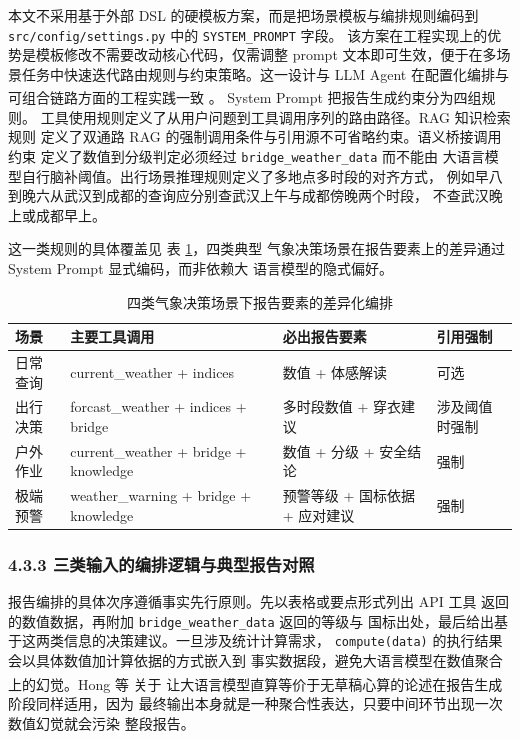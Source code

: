 \documentclass[a4paper]{article}
\newcommand{\song}{\CJKfamily{song}}
\theoremstyle{definition}
\theoremstyle{plain}
\theoremstyle{remark}
\newcommand{\reftab}[1]{表 \ref{#1}}
\let\oldcite\cite
\renewcommand{\cite}[1]{\textsuperscript{\oldcite{#1}}}
\newcommand{\bk}{\discretionary{}{}{}}
\begin{document}
本文不采用基于外部 DSL 的硬模板方案，而是把场景模板与编排规则编码到
\texttt{src/\bk{}config/\bk{}settings.\bk{}py} 中的 \texttt{SYSTEM\_\bk{}PROMPT} 字段。
该方案在工程实现上的优势是模板修改不需要改动核心代码，仅需调整 prompt
文本即可生效，便于在多场景任务中快速迭代路由规则与约束策略。这一设计与
LLM Agent 在配置化编排与可组合链路方面的工程实践一致 \cite{ref10,ref15,ref18}。
System Prompt 把报告生成约束分为四组规则。
工具使用规则定义了从用户问题到工具调用序列的路由路径。RAG 知识检索规则
定义了双通路 RAG 的强制调用条件与引用源不可省略约束。语义桥接调用约束
定义了数值到分级判定必须经过 \texttt{bridge\_\bk{}weather\_\bk{}data} 而不能由
大语言模型自行脑补阈值。出行场景推理规则定义了多地点多时段的对齐方式，
例如早八到晚六从武汉到成都的查询应分别查武汉上午与成都傍晚两个时段，
不查武汉晚上或成都早上。

这一类规则的具体覆盖见 \reftab{tab:report-template-routing}，四类典型
气象决策场景在报告要素上的差异通过 System Prompt 显式编码，而非依赖大
语言模型的隐式偏好。

\begin{table}[!ht]
    \centering
    \caption{四类气象决策场景下报告要素的差异化编排}
    \label{tab:report-template-routing}
    \song\fontsize{9pt}{12pt}\selectfont
    \renewcommand{\arraystretch}{0.95}
    \begin{tabular}{llll}
        \toprule
        场景 & 主要工具调用 & 必出报告要素 & 引用强制 \\
        \midrule
        日常查询 & current\_weather + indices & 数值 + 体感解读 & 可选 \\
        出行决策 & forcast\_weather + indices + bridge & 多时段数值 + 穿衣建议 & 涉及阈值时强制 \\
        户外作业 & current\_weather + bridge + knowledge & 数值 + 分级 + 安全结论 & 强制 \\
        极端预警 & weather\_warning + bridge + knowledge & 预警等级 + 国标依据 + 应对建议 & 强制 \\
        \bottomrule
    \end{tabular}
\end{table}

\subsubsection*{4.3.3 \quad 三类输入的编排逻辑与典型报告对照}

报告编排的具体次序遵循事实先行原则。先以表格或要点形式列出 API 工具
返回的数值数据，再附加 \texttt{bridge\_\bk{}weather\_\bk{}data} 返回的等级与
国标出处，最后给出基于这两类信息的决策建议。一旦涉及统计计算需求，
\texttt{compute(data)} 的执行结果会以具体数值加计算依据的方式嵌入到
事实数据段，避免大语言模型在数值聚合上的幻觉。Hong 等 \cite{ref20} 关于
让大语言模型直算等价于无草稿心算的论述在报告生成阶段同样适用，因为
最终输出本身就是一种聚合性表达，只要中间环节出现一次数值幻觉就会污染
整段报告。
\end{document}
